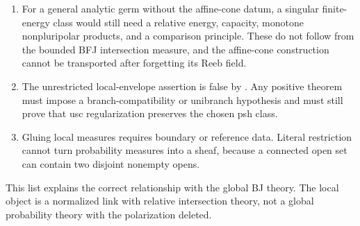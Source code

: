 \begin{enumerate}
      ideal-psh completion, homogeneous normalization transport, and
      finite-map-compatible envelope.  The generic trace theorem
       gives a pushforward
      retraction, its exact envelope inequality, total-variation-isometric
      signed-measure lift and dual norm-one projection, the associated
      finite conditional-expectation and variance identities, and
      conductor-scaled principal descent exactly when the branch map is
      surjective, while
       replaces the conductor
      choice by one canonical determinant norm for finite flat curve maps.
      Identifying that candidate with an
      independently defined singular psh or nef cone, and every
      intersection-theoretic layer, remain beyond these calculations.  In
      fact,
       identifies
      the radial-extendable cone on every isolated conductor-controlled
      disc-normalized curve singularity as
      $\{0\}\cup[-\infty,0)^q$, excluding precisely the mixed-zero faces
      of the complete ideal-psh orthant; the ordinary multinode is the
      explicit special case of
      .
\item For a general analytic germ without the affine-cone datum, a singular
      finite-energy class would still need a relative energy, capacity,
      monotone nonpluripolar products, and a comparison principle.  These do
      not follow from the bounded BFJ intersection measure, and the
      affine-cone construction cannot be transported after forgetting its
      Reeb field.
\item The unrestricted local-envelope assertion is false by
      .  Any positive theorem must impose
      a branch-compatibility or unibranch hypothesis and must still prove
      that usc regularization preserves the chosen psh class.
\item Gluing local measures requires boundary or reference data.  Literal
      restriction cannot turn probability measures into a sheaf, because a
      connected open set can contain two disjoint nonempty opens.
\end{enumerate}

This list explains the correct relationship with the global BJ theory.  The
local object is a normalized link with relative intersection theory, not a
global probability theory with the polarization deleted.

